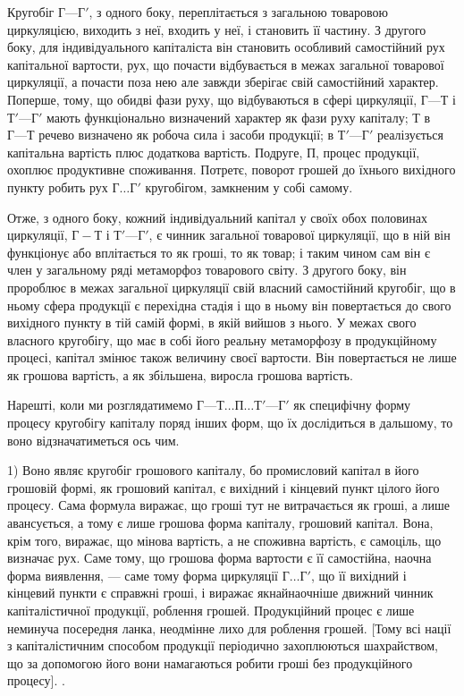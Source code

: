 Кругобіг $Г — Г'$, з одного боку, переплітається з загальною товаровою
циркуляцією, виходить з неї, входить у неї, і становить її частину. З другого
боку, для індивідуального капіталіста він становить особливий самостійний
рух капітальної вартости, рух, що почасти відбувається в межах загальної
товарової циркуляції, а почасти поза нею але завжди зберігає свій самостійний
характер. Поперше, тому, що обидві фази руху, що відбуваються
в сфері циркуляції, $Г — Т$ і $Т' — Г'$ мають функціонально визначений
характер як фази руху капіталу; Т в $Г — Т$ речево визначено як
робоча сила і засоби продукції; в $Т' — Г'$ реалізується капітальна вартість
плюс додаткова вартість. Подруге, П, процес продукції, охоплює продуктивне
споживання. Потретє, поворот грошей до їхнього вихідного пункту
робить рух $Г\dots{} Г'$ кругобігом, замкненим у собі самому.

Отже, з одного боку, кожний індивідуальний капітал у своїх обох
половинах циркуляції, $Г-Т$ і $Т' — Г'$, є чинник загальної товарової
циркуляції, що в ній він функціонує або вплітається то як гроші, то як
товар; і таким чином сам він є член у загальному ряді метаморфоз товарового
світу. З другого боку, він пророблює в межах загальної циркуляції свій
власний самостійний кругобіг, що в ньому сфера продукції є перехідна
стадія і що в ньому він повертається до свого вихідного пункту в тій
самій формі, в якій вийшов з нього. У межах свого власного кругобігу,
що має в собі його реальну метаморфозу в продукційному процесі,
капітал змінює також величину своєї вартости. Він повертається не лише
як грошова вартість, а як збільшена, виросла грошова вартість.

Нарешті, коли ми розглядатимемо $Г — Т\dots{} П\dots{} Т' — Г'$ як специфічну
форму процесу кругобігу капіталу поряд інших форм, що їх дослідиться
в дальшому, то воно відзначатиметься ось чим.

1) Воно являє кругобіг грошового капіталу, бо промисловий капітал
в його грошовій формі, як грошовий капітал, є вихідний і кінцевий
пункт цілого його процесу. Сама формула виражає, що гроші тут не
витрачається як гроші, а лише авансується, а тому є лише грошова
форма капіталу, грошовий капітал. Вона, крім того, виражає, що мінова
вартість, а не споживна вартість, є самоціль, що визначає рух. Саме тому,
що грошова форма вартости є її самостійна, наочна форма виявлення, —
саме тому форма циркуляції $Г\dots{} Г'$, що її вихідний і кінцевий
пункти є справжні гроші, і виражає якнайнаочніше движний чинник
капіталістичної продукції, роблення грошей. Продукційний процес
є лише неминуча посередня ланка, неодмінне лихо для роблення грошей.
[Тому всі нації з капіталістичним способом продукції періодично захоплюються
шахрайством, що за допомогою його вони намагаються робити
гроші без продукційного процесу]. .


